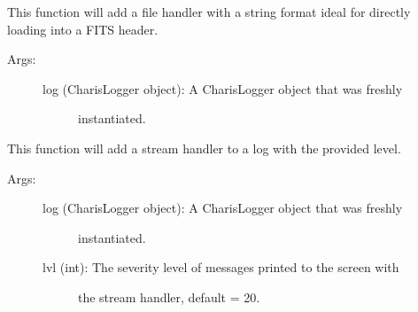 \documentclass[letterpaper,10pt,english]{sphinxmanual}
\begin{document}

\begin{fulllineitems}
\label{tools:tools.initLogger.addFitsStyleHandler}
This function will add a file handler with a string format ideal for 
directly loading into a FITS header.
\begin{description}
\item[{Args:}] \leavevmode\begin{description}
\item[{log (CharisLogger object): A CharisLogger object that was freshly }] \leavevmode
instantiated.

\end{description}

\end{description}

\end{fulllineitems}


\begin{fulllineitems}
\label{tools:tools.initLogger.addStreamHandler}
This function will add a stream handler to a log with the provided level.
\begin{description}
\item[{Args:}] \leavevmode\begin{description}
\item[{log (CharisLogger object): A CharisLogger object that was freshly }] \leavevmode
instantiated.

\item[{lvl (int): The severity level of messages printed to the screen with }] \leavevmode
the stream handler, default = 20.

\end{description}

\end{description}

\end{fulllineitems}

\end{document}
